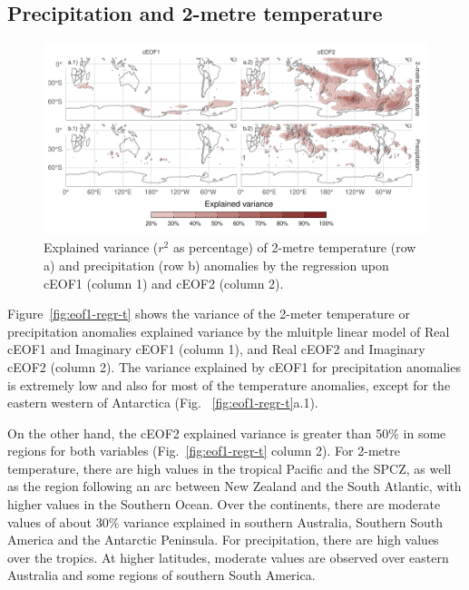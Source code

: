 \documentclass[smallextended]{svjour3}       %
\begin{document}
\hypertarget{precipitation}{%
\subsection{Precipitation and 2-metre temperature}\label{precipitation}}

\begin{figure}
\centering
\includegraphics{../figures/pp-t2m-r2-1.pdf}
\caption{\label{fig:pp-t2m-r2}Explained variance (\(r^2\) as percentage) of 2-metre temperature (row a) and precipitation (row b) anomalies by the regression upon cEOF1 (column 1) and cEOF2 (column 2).}
\end{figure}



Figure~\ref{fig:eof1-regr-t} shows the variance of the 2-meter temperature or precipitation anomalies explained variance by the mluitple linear model of Real cEOF1 and Imaginary cEOF1 (column 1), and Real cEOF2 and Imaginary cEOF2 (column 2).
The variance explained by cEOF1 for precipitation anomalies is extremely low and also for most of the temperature anomalies, except for the eastern western of Antarctica (Fig.~ \ref{fig:eof1-regr-t}a.1).

On the other hand, the cEOF2 explained variance is greater than 50\% in some regions for both variables (Fig.~\ref{fig:eof1-regr-t} column 2).
For 2-metre temperature, there are high values in the tropical Pacific and the SPCZ, as well as the region following an arc between New Zealand and the South Atlantic, with higher values in the Southern Ocean.
Over the continents, there are moderate values of about 30\% variance explained in southern Australia, Southern South America and the Antarctic Peninsula.
For precipitation, there are high values over the tropics. At higher latitudes, moderate values are observed over eastern Australia and some regions of southern South America.
\end{document}
